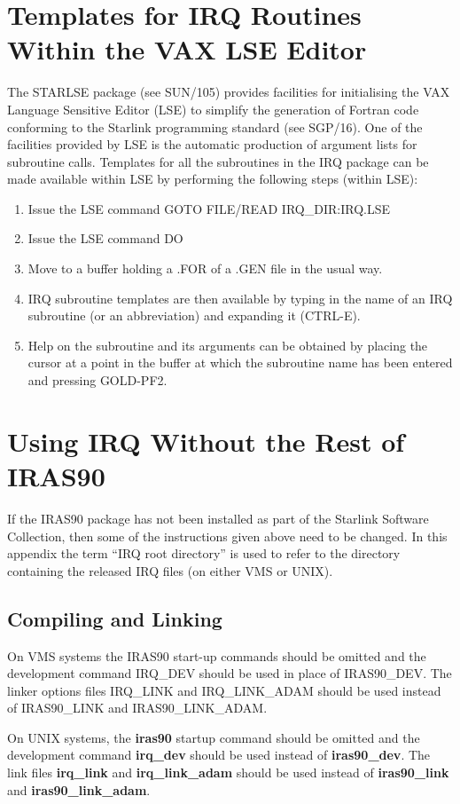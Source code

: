 \section {Templates for IRQ Routines Within the VAX LSE Editor}
The STARLSE package (see SUN/105) provides facilities for initialising the VAX
Language Sensitive Editor (LSE) to simplify the generation of Fortran
code conforming to the Starlink programming standard (see SGP/16). One of the
facilities provided by LSE is the automatic production of argument lists for
subroutine calls. Templates for all the subroutines in the IRQ package can be 
made available within LSE by performing the following steps (within LSE):
\begin{enumerate}
\item Issue the LSE command GOTO FILE/READ IRQ\_DIR:IRQ.LSE
\item Issue the LSE command DO
\item Move to a buffer holding a .FOR of a .GEN file in the usual way.
\item IRQ subroutine templates are then available by typing in the name of an 
IRQ subroutine (or an abbreviation) and expanding it (CTRL-E).
\item Help on the subroutine and its arguments can be obtained by placing the
cursor at a point in the buffer at which the subroutine name has been entered 
and pressing GOLD-PF2.
\end{enumerate}

\section {Using IRQ Without the Rest of IRAS90}
\label {APP:NOSTAR}
If the IRAS90 package has not been installed as part of the Starlink 
Software Collection, then some of the instructions given above need to be 
changed. In this appendix the term ``IRQ root directory'' is used to refer to
the directory containing the released IRQ files (on either VMS or UNIX).

\subsection{Compiling and Linking}
On VMS systems the IRAS90 start-up commands should be omitted and the 
development command IRQ\_DEV should be used in place of IRAS90\_DEV. The
linker options files IRQ\_LINK and IRQ\_LINK\_ADAM should be used instead
of IRAS90\_LINK and IRAS90\_LINK\_ADAM.

On UNIX systems, the {\bf iras90} startup command should be omitted and the
development command {\bf irq\_dev} should be used instead of {\bf iras90\_dev}. 
The link files {\bf irq\_link} and {\bf irq\_link\_adam} should be used instead
of {\bf iras90\_link} and {\bf iras90\_link\_adam}. 

